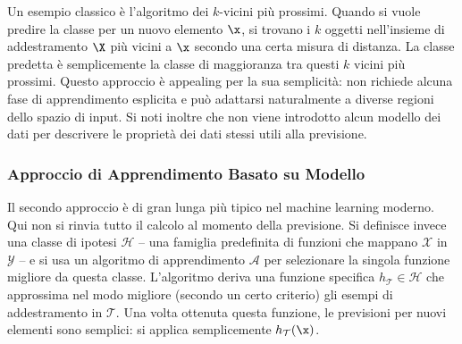 \begin{center}
\end{center}

Un esempio classico è l'algoritmo dei \alert{$k$-vicini più prossimi}. Quando si vuole predire la classe per un nuovo elemento $\x$, si trovano i $k$ oggetti nell'insieme di addestramento $\X$ più vicini a $\x$ secondo una certa misura di distanza. La classe predetta è semplicemente la classe di maggioranza tra questi $k$ vicini più prossimi. Questo approccio è appealing per la sua semplicità: non richiede alcuna fase di apprendimento esplicita e può adattarsi naturalmente a diverse regioni dello spazio di input. Si noti inoltre che non viene introdotto alcun modello dei dati per descrivere le proprietà dei dati stessi utili alla previsione.

\subsubsection*{Approccio di Apprendimento Basato su Modello}

Il secondo approccio è di gran lunga più tipico nel machine learning moderno. Qui non si rinvia tutto il calcolo al momento della previsione. Si definisce invece una \alert{classe di ipotesi} $\mathcal{H}$ -- una famiglia predefinita di funzioni che mappano $\mathcal{X}$ in $\mathcal{Y}$ -- e si usa un algoritmo di apprendimento $\mathcal{A}$ per selezionare la singola funzione migliore da questa classe. L'algoritmo deriva una funzione specifica $h_{\mathcal{T}} \in \mathcal{H}$ che approssima nel modo migliore (secondo un certo criterio) gli esempi di addestramento in $\mathcal{T}$. Una volta ottenuta questa funzione, le previsioni per nuovi elementi sono semplici: si applica semplicemente $h_{\mathcal{T}}(\x)$.

